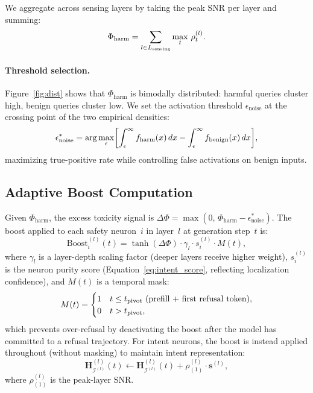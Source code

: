 \documentclass{article}
\newcommand{\Phiharm}{\Phi_{\mathrm{harm}}}
\newcommand{\epsnoise}{\epsilon_{\mathrm{noise}}}
\begin{document}
We aggregate across sensing layers by taking the peak SNR per
layer and summing:
\begin{equation}
  \Phiharm = \sum_{l \in L_{\rm sensing}} \max_t\, \rho_t^{(l)}.
  \label{eq:phi}
\end{equation}

\paragraph{Threshold selection.}
Figure~\ref{fig:dist} shows that $\Phiharm$ is
bimodally distributed: harmful queries cluster high, benign queries
cluster low.
We set the activation threshold $\epsnoise$ at the crossing point
of the two empirical densities:
\begin{equation}
  \epsnoise^* = \arg\max_{\epsilon}
  \biggl[
    \int_\epsilon^\infty f_{\rm harm}(x)\,dx
    - \int_\epsilon^\infty f_{\rm benign}(x)\,dx
  \biggr],
  \label{eq:threshold}
\end{equation}
maximizing true-positive rate while controlling false activations
on benign inputs.

\subsection{Adaptive Boost Computation}

Given $\Phiharm$, the excess toxicity signal is
$\Delta\Phi = \max(0,\, \Phiharm - \epsnoise^*)$.
The boost applied to each safety neuron~$i$ in layer~$l$ at
generation step~$t$ is:
\begin{equation}
  \mathrm{Boost}_i^{(l)}(t) =
  \tanh(\Delta\Phi) \cdot \gamma_l \cdot s_i^{(l)} \cdot M(t),
  \label{eq:boost}
\end{equation}
where $\gamma_l$ is a layer-depth scaling factor (deeper layers
receive higher weight), $s_i^{(l)}$ is the neuron purity score
(Equation~\ref{eq:intent_score}, reflecting localization
confidence), and $M(t)$ is a temporal mask:
\begin{equation}
  M(t) = \begin{cases}
    1 & t \leq t_{\rm pivot} \text{ (prefill + first refusal token)},\\
    0 & t > t_{\rm pivot},
  \end{cases}
  \label{eq:mask}
\end{equation}
which prevents over-refusal by deactivating the boost after the
model has committed to a refusal trajectory.
For intent neurons, the boost is instead applied throughout
(without masking) to maintain intent representation:
\begin{equation}
  \mathbf{H}_{\mathcal{I}^{(l)}}^{(l)}(t) \leftarrow
  \mathbf{H}_{\mathcal{I}^{(l)}}^{(l)}(t)
  + \rho_{(1)}^{(l)} \cdot \mathbf{s}^{(l)},
  \label{eq:intent_boost}
\end{equation}
where $\rho_{(1)}^{(l)}$ is the peak-layer SNR.
\end{document}
